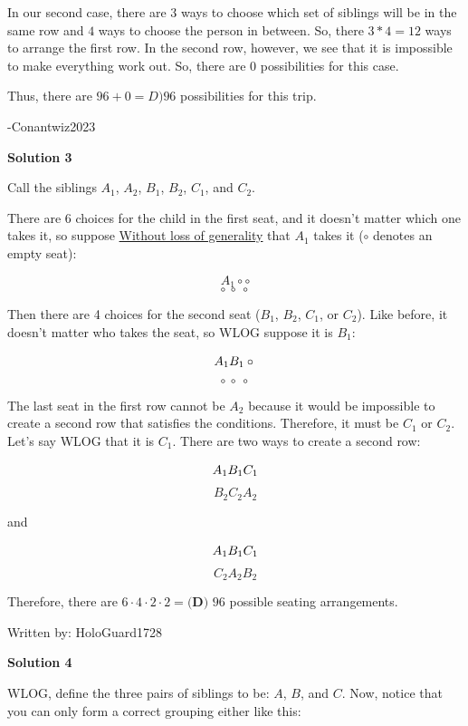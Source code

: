 \begin{enumerate}
 In our second case, there are $3$ ways to choose which set of siblings will be in the same row and $4$ ways to choose the person in between. So, there $3*4 = 12$ ways to arrange the first row. In the second row, however, we see that it is impossible to make everything work out. So, there are $0$ possibilities for this case.

 Thus, there are $96+0 = \boxed{D) 96}$ possibilities for this trip.

 -Conantwiz2023

 



\textbf{Solution 3}

Call the siblings $A_1$, $A_2$, $B_1$, $B_2$, $C_1$, and $C_2$.

 There are 6 choices for the child in the first seat, and it doesn't matter which one takes it, so suppose \href{https://artofproblemsolving.com/wiki/index.php?title=Without\_loss\_of\_generality}{Without loss of generality} that $A_1$ takes it ($\circ$ denotes an empty seat):

 
 \[A_1 \circ \circ\]
 \[\circ \ \circ \ \circ\]

 Then there are 4 choices for the second seat ($B_1$, $B_2$, $C_1$, or $C_2$). Like before, it doesn't matter who takes the seat, so WLOG suppose it is $B_1$:

 
 \[A_1 B_1 \circ \\\]
 \[\circ \ \circ \ \circ\]

 The last seat in the first row cannot be $A_2$ because it would be impossible to create a second row that satisfies the conditions. Therefore, it must be $C_1$ or $C_2$. Let's say WLOG that it is $C_1$. There are two ways to create a second row:

 
 \[A_1 B_1 C_1 \\\]
 \[B_2 C_2 A_2\]

 and

 
 \[A_1 B_1 C_1 \\\]
 \[C_2 A_2 B_2\]

 Therefore, there are $6 \cdot 4 \cdot 2 \cdot 2= \boxed{\textbf{(D)} \text{ 96}}$ possible seating arrangements.

 Written by: HoloGuard1728

 



\textbf{Solution 4}

WLOG, define the three pairs of siblings to be: $A$, $B$, and $C$. Now, notice that you can only form a correct grouping either like this:


\end{enumerate}
